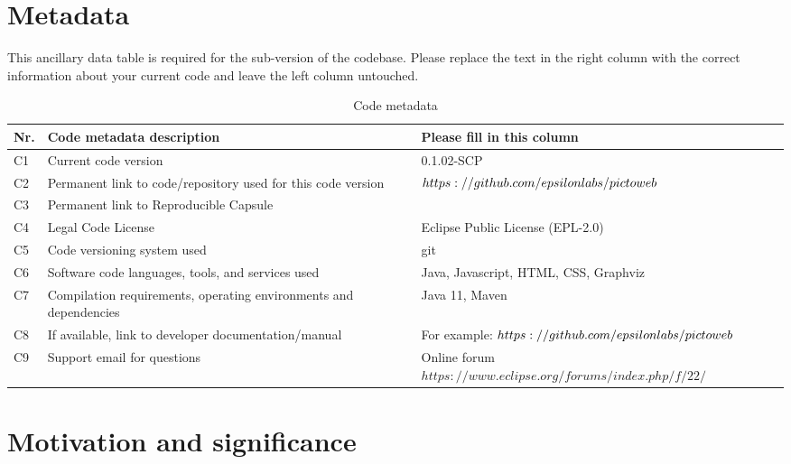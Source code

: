 \documentclass[preprint,12pt, a4paper]{elsarticle}
\begin{document}

\section*{Metadata}
\label{}

This ancillary data table is required for the sub-version of the codebase.
Please replace the text in the right column with the correct information
about your current code and leave the left column untouched.

\begin{table}[!h]
\begin{tabular}{|l|p{6.5cm}|p{6.5cm}|}
\hline
\textbf{Nr.} & \textbf{Code metadata description} & \textbf{Please fill in this column} \\
\hline
C1 & Current code version & 0.1.02-SCP\\
\hline
C2 & Permanent link to code/repository used for this code version & $https://github.com/epsilonlabs/picto\-web$ \\
\hline
C3  & Permanent link to Reproducible Capsule & \\
\hline
C4 & Legal Code License   & Eclipse Public License (EPL-2.0) \\
\hline
C5 & Code versioning system used & git \\
\hline
C6 & Software code languages, tools, and services used & Java, Javascript, HTML, CSS, Graphviz \\
\hline
C7 & Compilation requirements, operating environments and dependencies & Java 11, Maven \\
\hline
C8 & If available, link to developer documentation/manual & For example: $https://github.com/epsilonlabs/picto\-web$ \\
\hline
C9 & Support email for questions & Online forum $https://www.eclipse.org/forums/index.php/f/22/$\\
\hline
\end{tabular}
\caption{Code metadata}
\label{}
\end{table}

\section{Motivation and significance}
%
%
%
%
\end{document}
